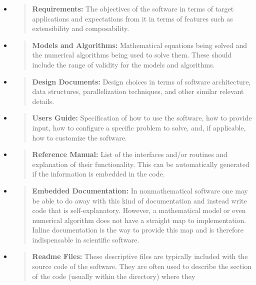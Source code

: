 \documentclass[]{article}
\begin{document}
\begin{itemize}
\item
  \begin{quote}
  \textbf{Requirements:} The objectives of the software in terms of
  target applications and expectations from it in terms of features such
  as extensibility and composability.
  \end{quote}
\item
  \begin{quote}
  \textbf{Models and Algorithms:} Mathematical equations being solved
  and the numerical algorithms being used to solve them. These should
  include the range of validity for the models and algorithms.
  \end{quote}
\item
  \begin{quote}
  \textbf{Design Documents:} Design choices in terms of software
  architecture, data structures, parallelization techniques, and other
  similar relevant details.
  \end{quote}
\item
  \begin{quote}
  \textbf{Users Guide:} Specification of how to use the software, how to
  provide input, how to configure a specific problem to solve, and, if
  applicable, how to customize the software.
  \end{quote}
\item
  \begin{quote}
  \textbf{Reference Manual:} List of the interfaces and/or routines and
  explanation of their functionality. This can be automatically
  generated if the information is embedded in the code.
  \end{quote}
\item
  \begin{quote}
  \textbf{Embedded Documentation:} In nonmathematical software one may
  be able to do away with this kind of documentation and instead write
  code that is self-explanatory. However, a mathematical model or even
  numerical algorithm does not have a straight map to implementation.
  Inline documentation is the way to provide this map and is therefore
  indispensable in scientific software.
  \end{quote}
\item
  \begin{quote}
  \textbf{Readme Files:} These descriptive files are typically included
  with the source code of the software. They are often used to describe
  the section of the code (usually within the directory) where they

\end{quote}
\end{itemize}
\end{document}
